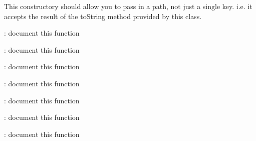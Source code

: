 
\begin{DoxyRefList}
\item[\label{todo__todo000001}%
\hypertarget{todo__todo000001}{}%
Member \hyperlink{class_key_path_ae333110e571e2126ce2e9a19f4900ab7}{Key\+Path\+:\+:Key\+Path} (std\+::string key\+\_\+name)]This constructory should allow you to pass in a path, not just a single key. i.\+e. it accepts the result of the to\+String method provided by this class.  
\item[\label{todo__todo000002}%
\hypertarget{todo__todo000002}{}%
Member \hyperlink{class_test_framework_a4f37e58d8b67f9da66372cf43f4281ae}{Test\+Framework\+:\+:add\+Test} (std\+::function$<$ bool(void)$>$ test\+Function)]\+: document this function  
\item[\label{todo__todo000003}%
\hypertarget{todo__todo000003}{}%
Member \hyperlink{class_test_framework_ace2588c0b0043546abc584b1d1b08e96}{Test\+Framework\+:\+:execute} ()]\+: document this function  
\item[\label{todo__todo000004}%
\hypertarget{todo__todo000004}{}%
Member \hyperlink{class_test_framework_ae12aac94ee9a745eb3ce46f5d003dcf2}{Test\+Framework\+:\+:get\+Tests\+Status} ()]\+: document this function  
\item[\label{todo__todo000005}%
\hypertarget{todo__todo000005}{}%
Member \hyperlink{class_test_framework_ad35b7b750378155531cf65e8163b67dd}{Test\+Framework\+:\+:get\+Total\+Tests\+Run} ()]\+: document this function  
\item[\label{todo__todo000006}%
\hypertarget{todo__todo000006}{}%
Member \hyperlink{class_test_framework_a34508c693cf7a3be01a3975065fa2457}{Test\+Framework\+:\+:get\+Total\+Tests\+Run\+Successfully} ()]\+: document this function  
\item[\label{todo__todo000007}%
\hypertarget{todo__todo000007}{}%
Member \hyperlink{class_test_framework_a80e30a085718a9e3db4e6f4e79cc9d48}{Test\+Framework\+:\+:Test\+Framework} ()]\+: document this function  
\item[\label{todo__todo000008}%
\hypertarget{todo__todo000008}{}%
Member \hyperlink{class_test_framework_aad3d6888fe40a083e767061a1ebf0c1d}{Test\+Framework\+:\+:$\sim$\+Test\+Framework} ()]\+: document this function 
\end{DoxyRefList}